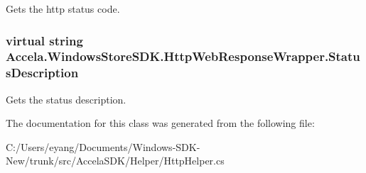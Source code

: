 Gets the http status code. 

\hypertarget{class_accela_1_1_windows_store_s_d_k_1_1_http_web_response_wrapper_a8a5a39715392836296662b8e1d3b41de}{
\subsubsection[{Status\+Description}]{\setlength{\rightskip}{0pt plus 5cm}virtual string Accela.\+Windows\+Store\+S\+D\+K.\+Http\+Web\+Response\+Wrapper.\+Status\+Description\hspace{0.3cm}{\ttfamily [get]}}}\label{class_accela_1_1_windows_store_s_d_k_1_1_http_web_response_wrapper_a8a5a39715392836296662b8e1d3b41de}


Gets the status description. 



The documentation for this class was generated from the following file\+:\begin{DoxyCompactItemize}
\item 
C\+:/\+Users/eyang/\+Documents/\+Windows-\/\+S\+D\+K-\/\+New/trunk/src/\+Accela\+S\+D\+K/\+Helper/Http\+Helper.\+cs\end{DoxyCompactItemize}
